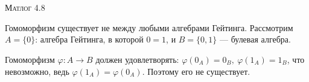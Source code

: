 \documentclass[10pt]{article}
\begin{document}
\def\chap#1#2{\ \\ {\large\bf#1 \ | \ \tt\scshape#2} \par}

\ \vspace{-1cm}

{\bf
\ \\
\Large\centerline{\scshape Матлог 4.8}
}\normalsize

\vspace*{1cm}

Гомоморфизм существует не между любыми алгебрами Гейтинга. 
Рассмотрим $A = \{ 0\}$: алгебра Гейтинга, в которой $0 = 1$, и $B = \{ 0, 1 \}$ --- булевая алгебра.

Гомоморфизм $\varphi: A \to B$ должен удовлетворять: $\varphi(0_A) = 0_B,\ \varphi(1_A) = 1_B$, что невозможно, ведь $\varphi(1_A) = \varphi(0_A)$.
Поэтому его не существует.
\end{document}
